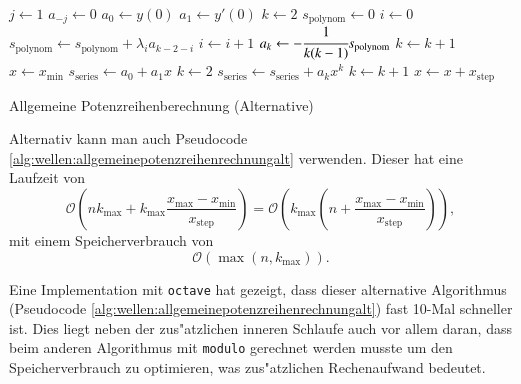 \begin{algorithm}
	\begin{algorithmic}[1]
		\State $j \gets 1$
			\State $a_{-j} \gets 0$
		\EndFor
		\State $a_0 \gets y(0)$
		\State $a_1 \gets y'(0)$
		\State $k \gets 2$
			\State $s_{\text{polynom}} \gets 0$
			\State $i \gets 0$
				\State $s_{\text{polynom}} \gets s_{\text{polynom}}+\lambda_i 
				a_{k-2-i}$
				\State $i \gets i + 1$
			\EndFor
			\State $a_k \gets -\cfrac{1}{k(k-1)} s_{\text{polynom}}$
			\State $k \gets k + 1$
		\EndFor
		\State $x \gets x_{\text{min}}$
			\State $s_{\text{series}} \gets a_0 + a_1x$
			\State $k \gets 2$
				\State $s_{\text{series}} \gets s_{\text{series}} + a_k x^k$
				\State $k \gets k + 1$
			\EndFor
			\State $x \gets x + x_{\text{step}}$
		\EndFor
	\end{algorithmic}
	\caption{Allgemeine Potenzreihenberechnung (Alternative)} 
	\label{alg:wellen:allgemeinepotenzreihenrechnungalt}
\end{algorithm}

Alternativ kann man auch Pseudocode 
\ref{alg:wellen:allgemeinepotenzreihenrechnungalt} verwenden. Dieser hat eine 
Laufzeit von
\begin{equation*}
	\mathcal{O}
	\left(
		nk_{\text{max}} + k_{\text{max}} 
		\frac{x_{\text{max}}-x_{\text{min}}}{x_{\text{step}}}
	\right)
	=
	\mathcal{O}
	\left(
		k_{\text{max}}
		\left(
			n+\frac{x_{\text{max}}-x_{\text{min}}}{x_{\text{step}}}
		\right)
	\right),
\end{equation*}
mit einem Speicherverbrauch von
\begin{equation*}
	\mathcal{O}
	\left(
		\max(n, k_{\text{max}})
	\right).
\end{equation*}

Eine Implementation mit \texttt{octave} hat gezeigt, dass dieser alternative 
Algorithmus (Pseudocode \ref{alg:wellen:allgemeinepotenzreihenrechnungalt}) 
fast 10-Mal schneller ist. Dies liegt neben der zus"atzlichen inneren Schlaufe 
auch vor allem daran, dass beim anderen Algorithmus mit \texttt{modulo} 
gerechnet werden musste um den Speicherverbrauch zu optimieren, was 
zus"atzlichen Rechenaufwand bedeutet.